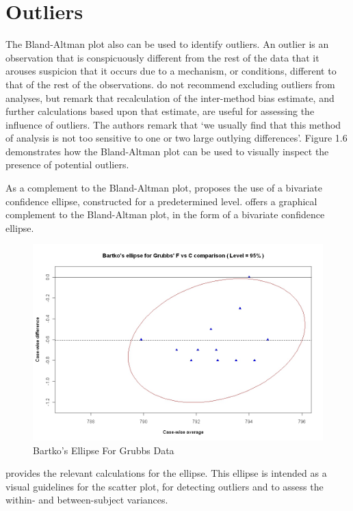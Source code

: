 \documentclass[12pt, a4paper]{report}
\theoremstyle{plain}
\theoremstyle{definition}
\theoremstyle{remark}
\begin{document}
\section{Outliers}
The Bland-Altman plot also can be used to identify outliers. An outlier is an observation that is conspicuously different from the rest of the data that it arouses suspicion that it occurs due to a mechanism, or conditions, different to that of the rest of the observations. \citet*{BA99} do not recommend excluding outliers from analyses,
but remark that recalculation of the inter-method bias estimate,
and further calculations based upon that estimate, are useful for
assessing the influence of outliers. The authors remark that `we
usually find that this method of analysis is not too sensitive to
one or two large outlying differences'. Figure 1.6 demonstrates how the Bland-Altman plot can be used to visually inspect the presence of potential outliers.
	
As a complement to the Bland-Altman plot, \citet{Bartko} proposes
the use of a bivariate confidence ellipse, constructed for a
predetermined level.
\citet{Bartko} offers a graphical complement to the Bland-Altman
plot, in the form of a bivariate confidence ellipse.

\begin{figure}[h!]
	\includegraphics[width=130mm]{images/GrubbsBartko.jpeg}
	\caption{Bartko's Ellipse For Grubbs Data}\label{GrubbsBartko}
\end{figure}

 \citet{AltmanEllipse} provides the relevant calculations for the ellipse. This ellipse is intended as a visual
guidelines for the scatter plot, for detecting outliers and to
assess the within- and between-subject variances.
\end{document}
